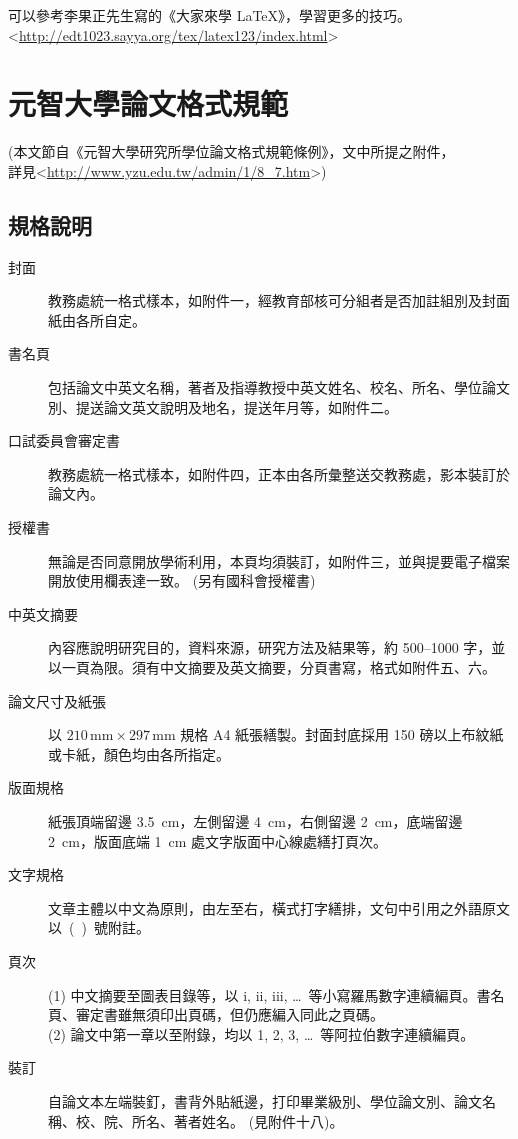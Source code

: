 可以參考李果正先生寫的《大家來學 {\LaTeX}》，學習更多的技巧。\\
\textless{}\url{http://edt1023.sayya.org/tex/latex123/index.html}\textgreater{}

\chapter{元智大學論文格式規範}
(本文節自《元智大學研究所學位論文格式規範條例》，文中所提之附件，\\
詳見\textless{}\url{http://www.yzu.edu.tw/admin/1/8_7.htm}\textgreater{})

\section{規格說明}
\begin{description}
\item[封面]  教務處統一格式樣本，如附件一，經教育部核可分組者是否加註組別及封面紙由各所自定。
\item[書名頁] 包括論文中英文名稱，著者及指導教授中英文姓名、校名、所名、學位論文別、提送論文英文說明及地名，提送年月等，如附件二。
\item[口試委員會審定書] 教務處統一格式樣本，如附件四，正本由各所彙整送交教務處，影本裝訂於論文內。
\item[授權書] 無論是否同意開放學術利用，本頁均須裝訂，如附件三，並與提要電子檔案開放使用欄表達一致。 (另有國科會授權書) 
\item[中英文摘要] 內容應說明研究目的，資料來源，研究方法及結果等，約 500--1000 字，並以一頁為限。須有中文摘要及英文摘要，分頁書寫，格式如附件五、六。
\item[論文尺寸及紙張] 以 $210\,\mathrm{mm} \times 297\,\mathrm{mm}$ 規格 A4 紙張繕製。封面封底採用 150 磅以上布紋紙或卡紙，顏色均由各所指定。
\item[版面規格] 紙張頂端留邊 3.5~cm，左側留邊 4~cm，右側留邊 2~cm，底端留邊 2~cm，版面底端 1~cm 處文字版面中心線處繕打頁次。
\item[文字規格] 文章主體以中文為原則，由左至右，橫式打字繕排，文句中引用之外語原文以~(~)~號附註。
\item[頁次] (1) 中文摘要至圖表目錄等，以 i, ii, iii, \ldots\ 等小寫羅馬數字連續編頁。書名頁、審定書雖無須印出頁碼，但仍應編入同此之頁碼。\\
(2) 論文中第一章以至附錄，均以 1, 2, 3, \ldots\ 等阿拉伯數字連續編頁。
\item[裝訂] 自論文本左端裝釘，書背外貼紙邊，打印畢業級別、學位論文別、論文名稱、校、院、所名、著者姓名。 (見附件十八)。
\end{description}


